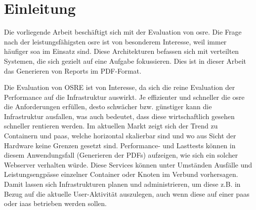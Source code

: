 \documentclass[main.tex]{subfiles}
\begin{document}


\chapter{Einleitung}





Die vorliegende Arbeit beschäftigt sich mit der Evaluation von \gls{osre}. Die Frage nach der leistungsfähigsten \gls{osre} ist von besonderem Interesse, weil immer häufiger \gls{soa} im Einsatz sind.  Diese Architekturen befassen sich mit verteilten Systemen, die sich gezielt auf eine Aufgabe fokussieren. Dies ist in dieser Arbeit das Generieren von Reports im PDF-Format.




Die Evaluation von OSRE ist von Interesse, da sich die reine Evaluation der Performance auf die Infrastruktur auswirkt. Je effizienter und schneller die \gls{osre} die Anforderungen erfüllen, desto schwächer bzw. günstiger kann die Infrastruktur ausfallen, was auch bedeutet, dass diese wirtschaftlich gesehen schneller rentieren werden. Im aktuellen Markt zeigt sich der Trend zu Containern und \acrfull{paas}, welche horizontal skalierbar sind und wo aus Sicht der Hardware keine Grenzen gesetzt sind.  Performance- und Lasttests  können in diesem Anwendungsfall (Generieren der PDFs) aufzeigen, wie sich ein solcher Webserver verhalten würde. Diese Services können unter Umständen Ausfälle und Leistungsengpässe einzelner Container oder Knoten im Verbund vorhersagen. Damit lassen sich Infrastrukturen planen und administrieren, um diese z.B. in Bezug auf die aktuelle User-Aktivität auszulegen, auch wenn diese auf einer \acrshort{paas} oder \acrfull{iaas} betrieben werden sollen. 
\end{document}
